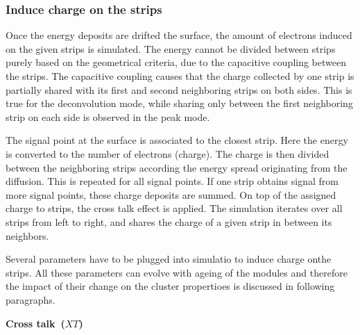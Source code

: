 
\subsubsection{Induce charge on the strips~\label{sec:induce}}

Once the energy deposits are drifted the surface, the amount of electrons induced on the given strips is simulated. The energy cannot be divided between strips purely based on the geometrical criteria, due to the capacitive coupling between the strips. The capacitive coupling causes that the charge collected by one strip is partially shared with its first and second neighboring strips on both sides. This is true for the deconvolution mode, while sharing only between the first neighboring strip on each side is observed in the peak mode.   

The signal point at the surface is associated to the closest strip. Here the energy is converted to the number of electrons (charge). The charge is then divided between the neighboring strips according the energy spread originating from the diffusion. This is repeated for all signal points. If one strip obtains signal from more signal points, these charge deposits are summed. On top of the assigned charge to strips, the cross talk effect is applied. The simulation iterates over all strips from left to right, and shares the charge of a given strip in between its neighbors.

Several parameters have to be plugged into simulatio to induce charge onthe  strips. All these parameters can evolve with ageing of the modules and therefore the impact of their change on the cluster propertioes is discussed in following paragraphs. 

\textbf{Cross talk~($XT$)}


